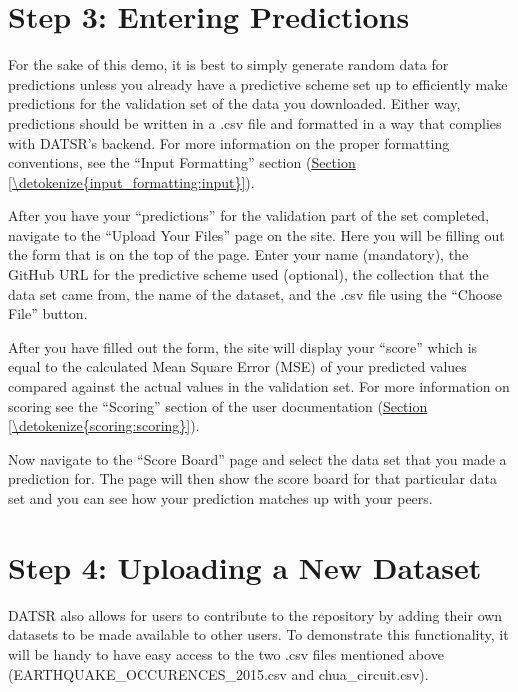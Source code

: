 \documentclass[letterpaper,10pt,english,openany,oneside]{sphinxmanual}
\begin{document}
\section{Step 3: Entering Predictions}
\label{\detokenize{walkthrough:step-3-entering-predictions}}
\sphinxAtStartPar
For the sake of this demo, it is best to simply generate random data for predictions unless you already have a predictive scheme set up to efficiently make predictions for the validation set of the data you downloaded. Either way, predictions should be written in a .csv file and formatted in a way that complies with DATSR’s backend. For more information on the proper formatting conventions, see the “Input Formatting” section (\hyperref[\detokenize{input_formatting:input}]{Section \ref{\detokenize{input_formatting:input}}}).

\sphinxAtStartPar
After you have your “predictions” for the validation part of the set completed, navigate to the “Upload Your Files” page on the site. Here you will be filling out the form that is on the top of the page. Enter your name (mandatory), the GitHub URL for the predictive scheme used (optional), the collection that the data set came from, the name of the dataset, and the .csv file using the “Choose File” button.

\sphinxAtStartPar
After you have filled out the form, the site will display your “score” which is equal to the calculated Mean Square Error (MSE) of your predicted values compared against the actual values in the validation set. For more information on scoring see the “Scoring” section of the user documentation (\hyperref[\detokenize{scoring:scoring}]{Section \ref{\detokenize{scoring:scoring}}}).

\sphinxAtStartPar
Now navigate to the “Score Board” page and select the data set that you made a prediction for. The page will then show the score board for that particular data set and you can see how your prediction matches up with your peers.


\section{Step 4: Uploading a New Dataset}
\label{\detokenize{walkthrough:step-4-uploading-a-new-dataset}}
\sphinxAtStartPar
DATSR also allows for users to contribute to the repository by adding their own datasets to be made available to other users. To demonstrate this functionality, it will be handy to have easy access to the two .csv files mentioned above (EARTHQUAKE\_OCCURENCES\_2015.csv and chua\_circuit.csv).
\end{document}
